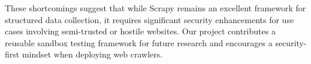 These shortcomings suggest that while Scrapy remains an excellent framework for structured data collection, it requires significant security enhancements for use cases involving semi-trusted or hostile websites.  Our project contributes a reusable sandbox testing framework for future research and encourages a security-first mindset when deploying web crawlers.
